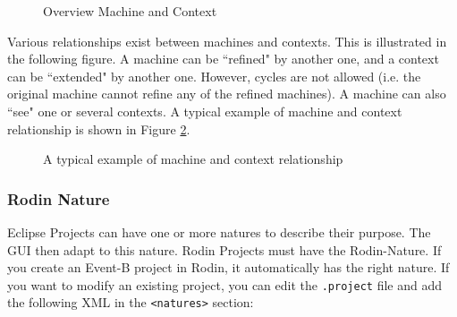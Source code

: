 \begin{figure}[!ht]
\begin{center}
  \hspace*{5em}
	\caption{Overview Machine and Context}
	\label{fig_ref_10_project1}
\end{center}
\end{figure}


Various relationships exist between machines and contexts. This is illustrated in the following figure. A machine can be ``refined" by another one, and a context can be ``extended" by another one. However, cycles are not allowed (i.e. the original machine cannot refine any of the refined machines). A machine can also ``see" one or several contexts. A typical example of machine and context relationship is shown in Figure \ref{fig_ref_10_project2}. 

\begin{figure}[ht]
\begin{center}
	\caption{A typical example of machine and context relationship}
	\label{fig_ref_10_project2}
\end{center}
\end{figure}

\subsubsection{Rodin Nature}
\label{rodin_nature}

Eclipse Projects can have one or more natures to describe their purpose.  The GUI then adapt to this nature.  Rodin Projects must have the Rodin-Nature.  If you create an Event-B project in Rodin, it automatically has the right nature.  If you want to modify an existing project, you can edit the \texttt{.project} file and add the following XML in the \texttt{<natures>} section:

